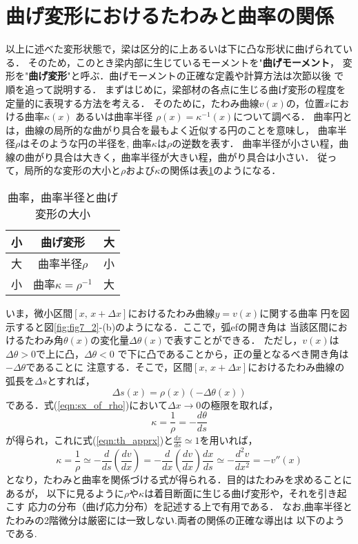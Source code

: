 \documentclass[10pt,a4j]{jbook}
\begin{document}
\section{曲げ変形におけるたわみと曲率の関係}
以上に述べた変形状態で，梁は区分的に上あるいは下に凸な形状に曲げられている．
そのため，このとき梁内部に生じているモーメントを"{\bf 曲げモーメント}，
変形を"{\bf 曲げ変形}"と呼ぶ．曲げモーメントの正確な定義や計算方法は次節以後
で順を追って説明する．
まずはじめに，梁部材の各点に生じる曲げ変形の程度を定量的に表現する方法を考える．
そのために，たわみ曲線$v(x)$の，位置$x$における曲率$\kappa(x)$ あるいは曲率半径
$\rho(x)=\kappa^{-1}(x)$について調べる．
曲率円とは，曲線の局所的な曲がり具合を最もよく近似する円のことを意味し，
曲率半径$\rho$はそのような円の半径を, 曲率$\kappa$は$\rho$の逆数を表す．
曲率半径が小さい程，曲線の曲がり具合は大きく，曲率半径が大きい程，曲がり具合は小さい．
従って，局所的な変形の大小と$\rho$および$\kappa$の関係は表\ref{tbl:tbl7_1}のようになる．
\begin{table}
\caption{曲率，曲率半径と曲げ変形の大小}
\begin{center}
\begin{tabular}{c|c|c}
小& 曲げ変形 & 大\\
\hline\hline
大&曲率半径$\rho$ & 小\\
\hline
	小& 曲率$\kappa=\rho^{-1}$& 大\\
\end{tabular}
\end{center}
\label{tbl:tbl7_1}
\end{table}
いま，微小区間$[x,\, x+\Delta x]$におけるたわみ曲線$y=v(x)$に関する曲率
円を図示すると図\ref{fig:fig7_2}-(b)のようになる．ここで，弧efの開き角は 
当該区間におけるたわみ角$\theta(x)$の変化量$\Delta \theta (x)$で表すことができる．
ただし，$v(x)$は$\Delta \theta >0$で上に凸，$\Delta \theta<0$
で下に凸であることから，正の量となるべき開き角は$-\Delta \theta$であることに
注意する．そこで，区間$[x,\,x+\Delta x]$におけるたわみ曲線の弧長を$\Delta s$とすれば，
\begin{equation}
	\Delta s(x) = \rho (x) \left(-\Delta \theta (x) \right)
	\label{eqn:sx_of_rho}
\end{equation}
である．式(\ref{eqn:sx_of_rho})において$\Delta x \rightarrow 0$の極限を取れば，
\begin{equation}
	\kappa = \frac{1}{\rho}=-\frac{d\theta}{ds}	
\end{equation}
が得られ，これに式(\ref{eqn:th_apprx})と$\frac{dx}{ds}\simeq 1$を用いれば，
\begin{equation}
	\kappa=\frac{1}{\rho}\simeq 
	-\frac{d}{ds}\left( \frac{dv}{dx}\right)	
	=
	-\frac{d}{dx}\left( \frac{dv}{dx}\right)	\frac{dx}{ds}
	\simeq
	-\frac{d^2 v}{dx^2}=-v''(x)
	\label{eqn:kpp_v2}
\end{equation}
となり，たわみと曲率を関係づける式が得られる．目的はたわみを求めることにあるが，
以下に見るように$\rho$や$\kappa$は着目断面に生じる曲げ変形や，それを引き起こす
応力の分布（曲げ応力分布）を記述する上で有用である．
なお,曲率半径とたわみの2階微分は厳密には一致しない.両者の関係の正確な導出は
以下のようである.
\end{document}
